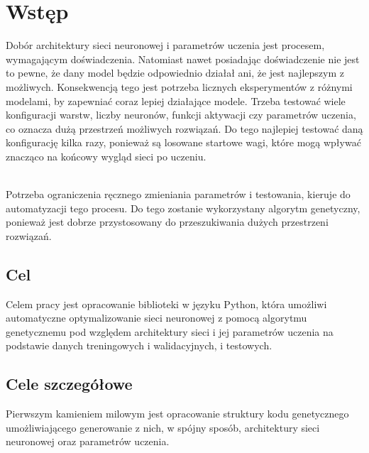 \section{Wstęp}
Dobór architektury sieci neuronowej i parametrów uczenia jest procesem,
wymagającym doświadczenia.
Natomiast nawet posiadając doświadczenie nie jest to pewne,
że dany model będzie odpowiednio działał ani,
że jest najlepszym z możliwych.
Konsekwencją tego jest potrzeba licznych eksperymentów z różnymi modelami,
by zapewniać coraz lepiej działające modele.
Trzeba testować wiele konfiguracji warstw,
liczby neuronów, funkcji aktywacji czy parametrów uczenia,
co oznacza dużą przestrzeń możliwych rozwiązań.
Do tego najlepiej testować daną konfigurację kilka razy,
ponieważ są losowane startowe wagi,
które mogą wpływać znacząco na końcowy wygląd sieci po uczeniu.

\noindent\\
Potrzeba ograniczenia ręcznego zmieniania parametrów i testowania,
kieruje do automa\-tyzacji tego procesu.
Do tego zostanie wykorzystany algorytm genetyczny,
ponieważ jest dobrze przystosowany
do przeszukiwania dużych przestrzeni rozwiązań.

\subsection*{Cel}
Celem pracy jest opracowanie biblioteki w języku Python,
która umożliwi automatyczne optyma\-lizowanie sieci neuronowej
z pomocą algorytmu genetycznemu pod względem architektury sieci
i jej parametrów uczenia na podstawie danych treningowych
i walidacyjnych, i testowych.



\subsection*{Cele szczegółowe}
Pierwszym kamieniem milowym jest opracowanie struktury
kodu genetycznego umożliwiającego generowanie z nich,
w spójny sposób, architektury sieci neuronowej oraz para\-metrów uczenia.

